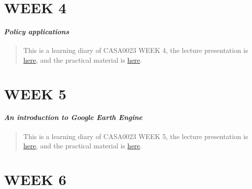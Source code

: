 \documentclass[
  letterpaper,
  DIV=11,
  numbers=noendperiod]{scrreprt}
\begin{document}
\hypertarget{week-4}{%
\chapter*{\texorpdfstring{\textbf{WEEK 4}}{WEEK 4}}\label{week-4}}

\hypertarget{policy-applications}{%
\subsubsection*{\texorpdfstring{\textbf{\emph{Policy
applications}}}{Policy applications}}\label{policy-applications}}

\begin{quote}
This is a learning diary of CASA0023 WEEK 4, the lecture presentation is
\href{https://andrewmaclachlan.github.io/CASA0023-lecture-4/\#1}{here},
and the practical material is
\href{https://andrewmaclachlan.github.io/CASA0023/4_policy.html}{here}.
\end{quote}


\hypertarget{week-5}{%
\chapter*{\texorpdfstring{\textbf{WEEK 5}}{WEEK 5}}\label{week-5}}

\hypertarget{an-introduction-to-google-earth-engine}{%
\subsubsection*{\texorpdfstring{\textbf{\emph{An introduction to Google
Earth
Engine}}}{An introduction to Google Earth Engine}}\label{an-introduction-to-google-earth-engine}}

\begin{quote}
This is a learning diary of CASA0023 WEEK 5, the lecture presentation is
\href{https://andrewmaclachlan.github.io/CASA0023-lecture-5/\#1}{here},
and the practical material is
\href{https://andrewmaclachlan.github.io/CASA0023/5_GEE_I.html}{here}.
\end{quote}


\hypertarget{week-6}{%
\chapter*{\texorpdfstring{\textbf{WEEK 6}}{WEEK 6}}\label{week-6}}
\end{document}
